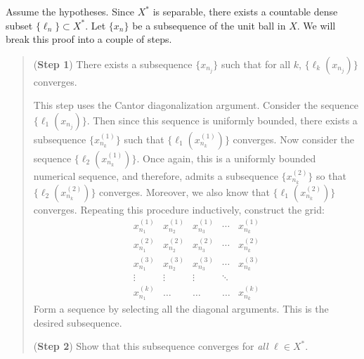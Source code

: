 \documentclass{article}
\begin{document}
\begin{itemize}
	\begin{solutions}
		Assume the hypotheses. Since $X^{\ast}$ is separable, there exists a countable dense subset $\{\ell_{n}\} \subset X^{\ast}$. Let $\{x_{n}\}$ be a subsequence of the unit ball in $X$. We will break this proof into a couple of steps. 
			\begin{quote}
				(\textbf{Step 1}) There exists a subsequence $\{x_{n_{j}}\}$ such that for all $k$, $\{\ell_{k}(x_{n_{j}})\}$ converges. 
				
				This step uses the Cantor diagonalization argument. Consider the sequence $\{\ell_{1}(x_{n_{j}})\}$. Then since this sequence is uniformly bounded, there exists a subsequence $\{x_{n_{k}}^{(1)}\}$ such that $\{\ell_{1}(x_{n_{k}}^{(1)})\}$ converges. Now consider the sequence $\{\ell_{2}(x_{n_{k}}^{(1)})\}$. Once again, this is a uniformly bounded numerical sequence, and therefore, admits a subsequence $\{x_{n_{k}}^{(2)}\}$ so that $\{\ell_{2}(x_{n_{k}}^{(2)})\}$ converges. Moreover, we also know that $\{\ell_{1}(x_{n_{k}}^{(2)})\}$ converges. Repeating this procedure inductively, construct the grid: 
					\begin{equation}
						\begin{matrix}
							x_{n_{1}}^{(1)} & x_{n_{2}}^{(1)} & x_{n_{3}}^{(1)} & \dotsm & x_{n_{k}}^{(1)} \\
							x_{n_{1}}^{(2)} & x_{n_{2}}^{(2)} & x_{n_{3}}^{(2)} & \dotsm & x_{n_{k}}^{(2)}\\
							x_{n_{1}}^{(3)} & x_{n_{2}}^{(3)} & x_{n_{3}}^{(3)} & \dotsm & x_{n_{k}}^{(3)}\\
							\vdots & \vdots & \vdots & \ddots \\
							x_{n_{1}}^{(k)} & \ldots & \ldots & \ldots &  x_{n_{k}}^{(k)} 
						\end{matrix}
					\end{equation} 
				Form a sequence by selecting all the diagonal arguments. This is the desired subsequence. 
			
			(\textbf{Step 2}) Show that this subsequence converges for \textit{all} $\ell \in X^{\ast}$.
			

\end{quote}
\end{solutions}
\end{itemize}
\end{document}
